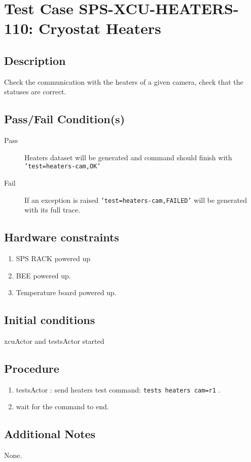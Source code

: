 \section{Test Case SPS-XCU-HEATERS-110: Cryostat Heaters}

\subsection{Description}

Check the communication with the heaters of a given camera, check that the statuses are correct.

\subsection{Pass/Fail Condition(s)}

\begin{description}
\item [Pass] Heaters dataset will be generated and command should finish with \texttt{'test=heaters-cam,OK'}
\item [Fail] If an exception is raised \texttt{'test=heaters-cam,FAILED'} will be generated with its full trace.

\end{description}

\subsection{Hardware constraints}

\begin{enumerate}
    \item SPS RACK powered up
    \item BEE powered up.
    \item Temperature board powered up.
\end{enumerate}

\subsection{Initial conditions}

xcuActor and testsActor started

\subsection{Procedure}

\begin{enumerate}
    \item testsActor : send heaters test command: \texttt{tests heaters cam=r1} .
    \item wait for the command to end.
\end{enumerate}

\subsection{Additional Notes}
None.
